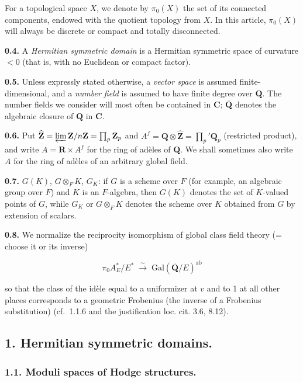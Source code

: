\documentclass[10pt,a4paper]{article}
\begin{document}
For a topological space \(X\), we denote by \(\pi_0(X)\) the set of its connected components, endowed with the quotient topology from \(X\). In this article, \(\pi_0(X)\) will always be discrete or compact and totally disconnected.

\textbf{0.4.} A \emph{Hermitian symmetric domain} is a Hermitian symmetric space of curvature \(<0\) (that is, with no Euclidean or compact factor).

\textbf{0.5.} Unless expressly stated otherwise, a \emph{vector space} is assumed finite-dimensional, and a \emph{number field} is assumed to have finite degree over \(\mathbf Q\). The number fields we consider will most often be contained in \(\mathbf C\); \(\overline{\mathbf Q}\) denotes the algebraic closure of \(\mathbf Q\) in \(\mathbf C\).

\textbf{0.6.} Put \(\widehat{\mathbf Z}=\varprojlim \mathbf Z/n\mathbf Z=\prod_p\mathbf Z_p\) and \(A^f=\mathbf Q\otimes\widehat{\mathbf Z}=\prod_p'\mathbf Q_p\) (restricted product), and write \(A=\mathbf R\times A^f\) for the ring of adèles of \(\mathbf Q\). We shall sometimes also write \(A\) for the ring of adèles of an arbitrary global field.

\textbf{0.7.} \(G(K)\), \(G\otimes_FK\), \(G_K\): if \(G\) is a scheme over \(F\) (for example, an algebraic group over \(F\)) and \(K\) is an \(F\)-algebra, then \(G(K)\) denotes the set of \(K\)-valued points of \(G\), while \(G_K\) or \(G\otimes_FK\) denotes the scheme over \(K\) obtained from \(G\) by extension of scalars.

\textbf{0.8.} We normalize the reciprocity isomorphism of global class field theory (= choose it or its inverse)

\[
\pi_0 A_E^*/E^*\;\xrightarrow{\sim}\;\mathrm{Gal}(\overline{\mathbf Q}/E)^{\mathrm{ab}}
\]

so that the class of the idèle equal to a uniformizer at \(v\) and to 1 at all other places corresponds to a geometric Frobenius (the inverse of a Frobenius substitution) (cf.~1.1.6 and the justification loc. cit. 3.6, 8.12).

\subsection{1. Hermitian symmetric domains.}

\subsubsection{1.1. Moduli spaces of Hodge structures.}
\end{document}

